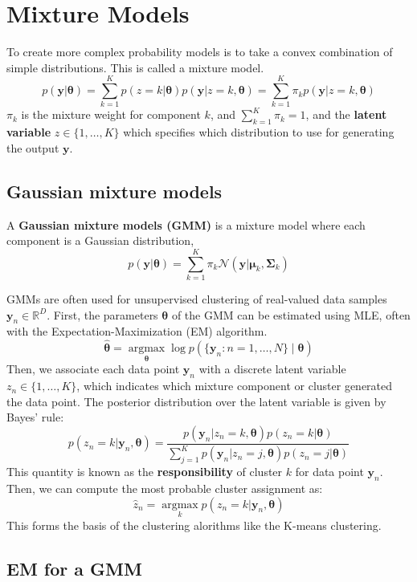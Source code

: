 \documentclass[11pt]{article}
\begin{document}
\clearpage
\section{Mixture Models}
To create more complex probability models is to take a convex combination of simple
distributions. This is called a mixture model.
\[
p(\boldsymbol{y}|\boldsymbol{\theta}) = \sum_{k=1}^{K} p(z=k|\boldsymbol{\theta}) p(\boldsymbol{y}|z=k, \boldsymbol{\theta}) = \sum_{k=1}^{K} \pi_k p(\boldsymbol{y}|z=k, \boldsymbol{\theta})
\]
$\pi_k$ is the mixture weight for component $k$, and $\sum_{k=1}^{K} \pi_k = 1$, and the \textbf{latent variable} $z \in \{1, \ldots, K\}$ which specifies which distribution to use for generating the output $\boldsymbol{y}$.

\subsection{Gaussian mixture models}
A \textbf{Gaussian mixture models (GMM)} is a mixture model where each component is a Gaussian distribution,
\[
p(\boldsymbol{y}|\boldsymbol{\theta}) = \sum_{k=1}^{K} \pi_k \mathcal{N}(\boldsymbol{y}|\boldsymbol{\mu}_k, \boldsymbol{\Sigma}_k)
\]

GMMs are often used for unsupervised clustering of real-valued data samples $\boldsymbol{y}_n \in \mathbb{R}^D$. 
First, the parameters $\boldsymbol{\theta}$ of the GMM can be estimated using MLE, often with the Expectation-Maximization (EM) algorithm.
\[
\hat{\boldsymbol{\theta}} = \operatorname*{argmax}_{\boldsymbol{\theta}} \log p(\{\boldsymbol{y}_n : n = 1, \ldots, N\} \mid \boldsymbol{\theta})
\]
Then, we associate each data point $\boldsymbol{y}_n$ with a discrete latent variable $z_n \in \{1, \ldots, K\}$, which indicates which mixture component or cluster generated the data point. The posterior distribution over the latent variable is given by Bayes' rule:
\[
p(z_n=k|\boldsymbol{y}_n, \boldsymbol{\theta}) = \frac{p(\boldsymbol{y}_n|z_n=k, \boldsymbol{\theta}) p(z_n=k|\boldsymbol{\theta})}{\sum_{j=1}^{K} p(\boldsymbol{y}_n|z_n=j, \boldsymbol{\theta}) p(z_n=j|\boldsymbol{\theta})} 
\]
This quantity is known as the \textbf{responsibility} of cluster $k$ for data point $\boldsymbol{y}_n$. Then, we can compute the most probable cluster assignment as:
\[
\hat{z}_n = \operatorname*{argmax}_{k} p(z_n=k|\boldsymbol{y}_n, \boldsymbol{\theta})
\]
This forms the basis of the clustering alorithms like the K-means clustering.

\subsection{EM for a GMM}
\end{document}
